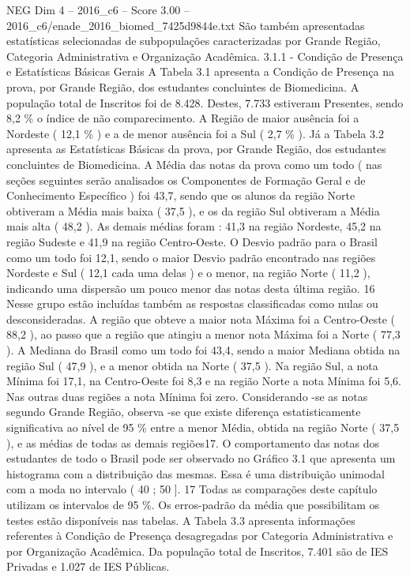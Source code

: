 \begin{textsample}{NEG Dim 4 – 2016\_c6 – Score 3.00 – 2016\_c6/enade\_2016\_biomed\_7425d9844e.txt}
São também apresentadas estatísticas selecionadas de subpopulações caracterizadas por Grande Região, Categoria Administrativa e Organização Acadêmica. 3.1.1 - Condição de Presença e Estatísticas Básicas Gerais A Tabela 3.1 apresenta a Condição de Presença na prova, por Grande Região, dos estudantes concluintes de Biomedicina.
A população total de Inscritos foi de 8.428.
Destes, 7.733 estiveram Presentes, sendo 8,2 \% o índice de não comparecimento.
A Região de maior ausência foi a Nordeste ( 12,1 \% ) e a de menor ausência foi a Sul ( 2,7 \% ).
Já a Tabela 3.2 apresenta as Estatísticas Básicas da prova, por Grande Região, dos estudantes concluintes de Biomedicina.
A Média das notas da prova como um todo ( nas seções seguintes serão analisados os Componentes de Formação Geral e de Conhecimento Específico ) foi 43,7, sendo que os alunos da região Norte obtiveram a Média mais baixa ( 37,5 ), e os da região Sul obtiveram a Média mais alta ( 48,2 ).
As demais médias foram : 41,3 na região Nordeste, 45,2 na região Sudeste e 41,9 na região Centro-Oeste.
O Desvio padrão para o Brasil como um todo foi 12,1, sendo o maior Desvio padrão encontrado nas regiões Nordeste e Sul ( 12,1 cada uma delas ) e o menor, na região Norte ( 11,2 ), indicando uma dispersão um pouco menor das notas desta última região. 16 Nesse grupo estão incluídas também as respostas classificadas como nulas ou desconsideradas.
A região que obteve a maior nota Máxima foi a Centro-Oeste ( 88,2 ), ao passo que a região que atingiu a menor nota Máxima foi a Norte ( 77,3 ).
A Mediana do Brasil como um todo foi 43,4, sendo a maior Mediana obtida na região Sul ( 47,9 ), e a menor obtida na Norte ( 37,5 ).
Na região Sul, a nota Mínima foi 17,1, na Centro-Oeste foi 8,3 e na região Norte a nota Mínima foi 5,6.
Nas outras duas regiões a nota Mínima foi zero.
Considerando -se as notas segundo Grande Região, observa -se que existe diferença estatisticamente significativa ao nível de 95 \% entre a menor Média, obtida na região Norte ( 37,5 ), e as médias de todas as demais regiões17.
O comportamento das notas dos estudantes de todo o Brasil pode ser observado no Gráfico 3.1 que apresenta um histograma com a distribuição das mesmas.
Essa é uma distribuição unimodal com a moda no intervalo ( 40 ; 50 ]. 17 Todas as comparações deste capítulo utilizam os intervalos de 95 \%.
Os erros-padrão da média que possibilitam os testes estão disponíveis nas tabelas.
A Tabela 3.3 apresenta informações referentes à Condição de Presença desagregadas por Categoria Administrativa e por Organização Acadêmica.
Da população total de Inscritos, 7.401 são de IES Privadas e 1.027 de IES Públicas.

\end{textsample}
